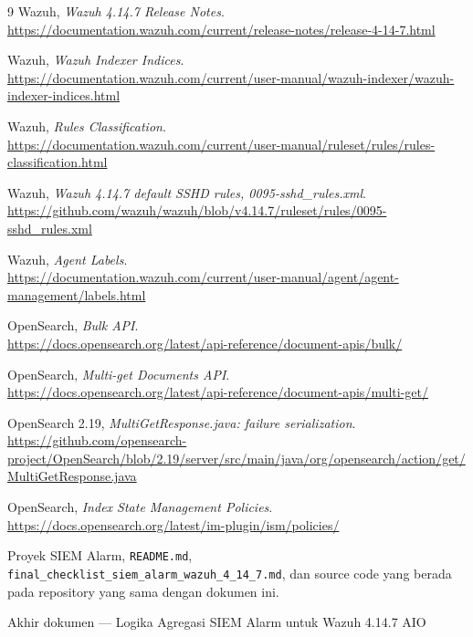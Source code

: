 \documentclass[11pt,a4paper,oneside]{report}
\newcommand{\projectfile}[1]{\texttt{#1}}
\begin{document}
\begin{thebibliography}{9}
Wazuh, \emph{Wazuh 4.14.7 Release Notes}.\\
\url{https://documentation.wazuh.com/current/release-notes/release-4-14-7.html}

Wazuh, \emph{Wazuh Indexer Indices}.\\
\url{https://documentation.wazuh.com/current/user-manual/wazuh-indexer/wazuh-indexer-indices.html}

Wazuh, \emph{Rules Classification}.\\
\url{https://documentation.wazuh.com/current/user-manual/ruleset/rules/rules-classification.html}

Wazuh, \emph{Wazuh 4.14.7 default SSHD rules, 0095-sshd\_rules.xml}.\\
\url{https://github.com/wazuh/wazuh/blob/v4.14.7/ruleset/rules/0095-sshd_rules.xml}

Wazuh, \emph{Agent Labels}.\\
\url{https://documentation.wazuh.com/current/user-manual/agent/agent-management/labels.html}

OpenSearch, \emph{Bulk API}.\\
\url{https://docs.opensearch.org/latest/api-reference/document-apis/bulk/}

OpenSearch, \emph{Multi-get Documents API}.\\
\url{https://docs.opensearch.org/latest/api-reference/document-apis/multi-get/}

OpenSearch 2.19, \emph{MultiGetResponse.java: failure serialization}.\\
\url{https://github.com/opensearch-project/OpenSearch/blob/2.19/server/src/main/java/org/opensearch/action/get/MultiGetResponse.java}

OpenSearch, \emph{Index State Management Policies}.\\
\url{https://docs.opensearch.org/latest/im-plugin/ism/policies/}

Proyek SIEM Alarm, \projectfile{README.md},
\projectfile{final\_checklist\_siem\_alarm\_wazuh\_4\_14\_7.md}, dan source code
yang berada pada repository yang sama dengan dokumen ini.
\end{thebibliography}

\vfill
\begin{center}
\color{LineGray}\small
Akhir dokumen --- Logika Agregasi SIEM Alarm untuk Wazuh 4.14.7 AIO
\end{center}
\end{document}
